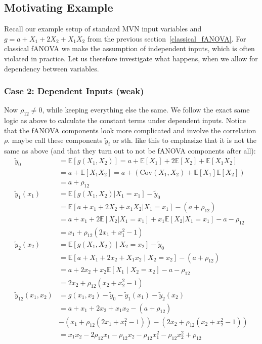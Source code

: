 \subsection{Motivating Example}
Recall our example setup of standard MVN input variables and \(g = a + X_1 + 2X_2 + X_1 X_2\) from the previous section~\ref{classical_fANOVA}.
For classical fANOVA we make the assumption of independent inputs, which is often violated in practice. Let us therefore investigate what happens, when we allow for dependency between variables.

\subsubsection*{Case 2: Dependent Inputs (weak)}
Now $\rho_{12} \neq 0$, while keeping everything else the same. We follow the exact same logic as above to calculate the
constant terms under dependent inputs. Notice that the fANOVA components look more complicated and involve the correlation $\rho$. {\color{red}maybe call these components $\tilde{y}_i$ or sth. like this to emphasize that it is not the same as above (and that they turn out to not be fANOVA components after all)}:
\begin{align*}
\tilde{y}_0 &= \mathbb{E}[g(X_1, X_2)] 
= a + \mathbb{E}[X_1] + 2\mathbb{E}[X_2] + \mathbb{E}[X_1 X_2] \\
&= a + \mathbb{E}[X_1 X_2] 
= a + \left( \text{Cov}(X_1, X_2) + \mathbb{E}[X_1]\mathbb{E}[X_2] \right) \\
&= a + \rho_{12} \\
\tilde{y}_1(x_1) 
&= \mathbb{E}[g(X_1, X_2) | X_1 = x_1] - \tilde{y}_0 \\
&= \mathbb{E}[a + x_1 + 2X_2 + x_1 X_2 | X_1 = x_1] - (a + \rho_{12}) \\
&= a + x_1 + 2\mathbb{E}[X_2 | X_1 = x_1] + x_1 \mathbb{E}[X_2 | X_1 = x_1] - a - \rho_{12} \\
&= x_1 + \rho_{12}(2x_1 + x_1^2 - 1) \\
\tilde{y}_2(x_2) 
&= \mathbb{E}[g(X_1, X_2) \mid X_2 = x_2] - \tilde{y}_0 \\
&= \mathbb{E}[a + X_1 + 2x_2 + X_1 x_2 \mid X_2 = x_2] - (a + \rho_{12}) \\
&= a + 2x_2 + x_2 \mathbb{E}[X_1 \mid X_2 = x_2] - a - \rho_{12} \\
&= 2x_2 + \rho_{12}(x_2 + x_2^2 - 1) \\
\tilde{y}_{12}(x_1, x_2) 
&= g(x_1, x_2) - \tilde{y}_0 - \tilde{y}_1(x_1) - \tilde{y}_2(x_2) \\
&= a + x_1 + 2x_2 + x_1 x_2 - (a + \rho_{12}) \\
&- (x_1 + \rho_{12}(2x_1 + x_1^2 - 1)) - (2x_2 + \rho_{12}(x_2 + x_2^2 - 1)) \\
&= x_1 x_2 - 2\rho_{12} x_1 - \rho_{12} x_2  - \rho_{12} x_1^2  - \rho_{12} x_2^2 + \rho_{12}
\end{align*}

